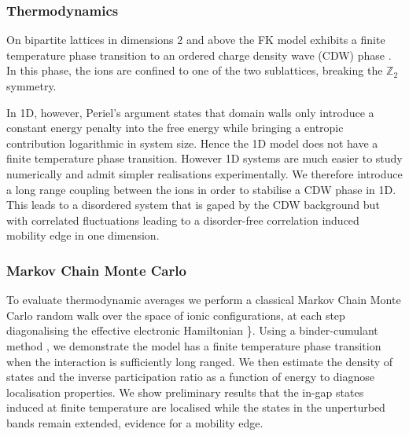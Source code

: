 \hypertarget{thermodynamics}{%
\subsubsection{Thermodynamics}\label{thermodynamics}}

On bipartite lattices in dimensions 2 and above the FK model exhibits a finite temperature phase transition to an ordered charge density wave (CDW) phase \textcite{maska_thermodynamics_2006-1}. In this phase, the ions are confined to one of the two sublattices, breaking the \(\mathbb{Z}_2\) symmetry.

In 1D, however, Periel's argument \autocite{peierls_isings_1936,kennedy_itinerant_1986} states that domain walls only introduce a constant energy penalty into the free energy while bringing a entropic contribution logarithmic in system size. Hence the 1D model does not have a finite temperature phase transition. However 1D systems are much easier to study numerically and admit simpler realisations experimentally. We therefore introduce a long range coupling between the ions in order to stabilise a CDW phase in 1D. This leads to a disordered system that is gaped by the CDW background but with correlated fluctuations leading to a disorder-free correlation induced mobility edge in one dimension.

\hypertarget{markov-chain-monte-carlo}{%
\subsubsection{Markov Chain Monte Carlo}\label{markov-chain-monte-carlo}}

To evaluate thermodynamic averages we perform a classical Markov Chain Monte Carlo random walk over the space of ionic configurations, at each step diagonalising the effective electronic Hamiltonian \textcite{maska_thermodynamics_2006-1}\}. Using a binder-cumulant method \autocite{binder_finite_1981,musial_monte_2002}, we demonstrate the model has a finite temperature phase transition when the interaction is sufficiently long ranged. We then estimate the density of states and the inverse participation ratio as a function of energy to diagnose localisation properties. We show preliminary results that the in-gap states induced at finite temperature are localised while the states in the unperturbed bands remain extended, evidence for a mobility edge.

